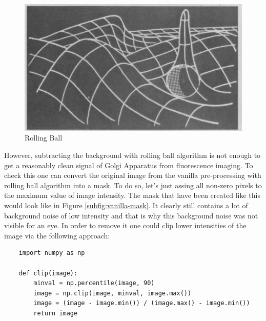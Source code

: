 \begin{figure}[htb]
	\begin{center}
		\includegraphics[width=0.5\linewidth]{bilder/rolling-ball.png}
		\caption{Rolling Ball}\label{fig:rolling-ball}
	\end{center}
\end{figure}

However, subtracting the background with rolling ball algorithm is not enough to get a reasonably clean signal of Golgi Apparatus from fluorescence imaging. To check this one can convert the original image from the vanilla pre-processing with rolling ball algorithm into a mask. To do so, let's just assing all non-zero pixels to the maximum value of image intensity. The mask that have been created like this would look like in Figure \ref{subfig:vanilla-mask}. It clearly still contains a lot of background noise of low intensity and that is why this background noise was not visible for an eye. In order to remove it one could clip lower intensities of the image via the following approach:

\begin{lstlisting}
	import numpy as np
		
	def clip(image):
		minval = np.percentile(image, 90)
		image = np.clip(image, minval, image.max())
		image = (image - image.min()) / (image.max() - image.min())
		return image
\end{lstlisting}


